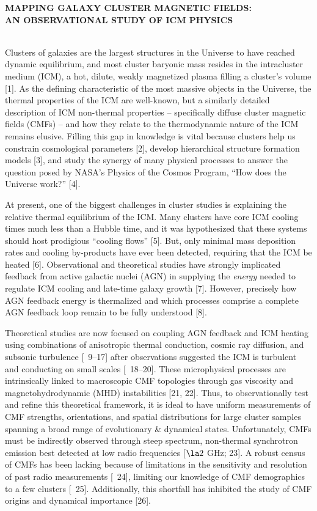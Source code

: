 \documentclass[letterpaper,12pt]{article}
\newcommand{\pcos}{posed by NASA's Physics of the Cosmos Program}
\begin{document}
\begin{center}
  {\bf\uppercase{mapping galaxy cluster magnetic fields:\\an
      observational study of icm physics}}
\end{center}

\\
\indent Clusters of galaxies are the largest structures in the
Universe to have reached dynamic equilibrium, and most cluster
baryonic mass resides in the intracluster medium (ICM), a hot, dilute,
weakly magnetized plasma filling a cluster's volume [1]. As the
defining characteristic of the most massive objects in the Universe,
the thermal properties of the ICM are well-known, but a similarly
detailed description of ICM non-thermal properties -- specifically
diffuse cluster magnetic fields (CMFs) -- and how they relate to the
thermodynamic nature of the ICM remains elusive. Filling this gap in
knowledge is vital because clusters help us constrain cosmological
parameters [2], develop hierarchical structure formation models [3],
and study the synergy of many physical processes to answer the
question \pcos, ``How does the Universe work?'' [4].

At present, one of the biggest challenges in cluster studies is
explaining the relative thermal equilibrium of the ICM. Many clusters
have core ICM cooling times much less than a Hubble time, and it was
hypothesized that these systems should host prodigious ``cooling
flows'' [5]. But, only minimal mass deposition rates and cooling
by-products have ever been detected, requiring that the ICM be heated
[6]. Observational and theoretical studies have strongly implicated
feedback from active galactic nuclei (AGN) in supplying the
{\it{energy}} needed to regulate ICM cooling and late-time galaxy
growth [7]. However, precisely how AGN feedback energy is thermalized
and which processes comprise a complete AGN feedback loop remain to be
fully understood [8].

Theoretical studies are now focused on coupling AGN feedback and ICM
heating using combinations of anisotropic thermal conduction, cosmic
ray diffusion, and subsonic turbulence [\eg\ 9--17] after observations
suggested the ICM is turbulent and conducting on small scales
[\eg\ 18--20]. These microphysical processes are intrinsically linked
to macroscopic CMF topologies through gas viscosity and
magnetohydrodynamic (MHD) instabilities [21, 22]. Thus, to
observationally test and refine this theoretical framework, it is
ideal to have uniform measurements of CMF strengths, orientations, and
spatial distributions for large cluster samples spanning a broad range
of evolutionary \& dynamical states. Unfortunately, CMFs must be
indirectly observed through steep spectrum, non-thermal synchrotron
emission best detected at low radio frequencies [$\la 2$ GHz; 23]. A
robust census of CMFs has been lacking because of limitations in the
sensitivity and resolution of past radio measurements [\eg\ 24],
limiting our knowledge of CMF demographics to a few clusters
[\eg\ 25]. Additionally, this shortfall has inhibited the study of CMF
origins and dynamical importance [26].
\end{document}
